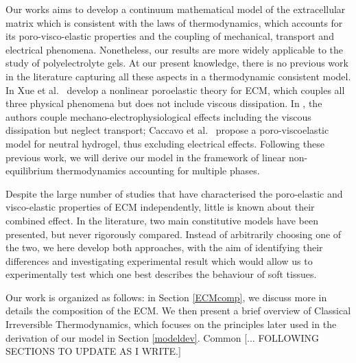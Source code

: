 Our works aims to develop a continuum mathematical model of the extracellular matrix which is consistent with the laws of thermodynamics, which accounts for its poro-visco-elastic properties and the coupling of mechanical, transport and electrical phenomena. Nonetheless, our results are more widely applicable to the study of polyelectrolyte gels. At our present knowledge, there is no previous work in the literature capturing all these aspects in a thermodynamic consistent model. In \cite{ecm1,ecm2} Xue et al.~ develop a nonlinear poroelastic theory for ECM, which couples all three physical phenomena but does not include viscous dissipation. In \cite{Jeru}, the authors couple mechano-electrophysiological effects including the viscous dissipation but neglect transport; Caccavo et al.~ \cite{Article1} propose a poro-viscoelastic model for neutral hydrogel, thus excluding electrical effects.  Following these previous work, we will derive our model in the framework of linear non-equilibrium thermodynamics \cite{NET} accounting for multiple phases.


Despite the large number of studies that have characterised the poro-elastic and visco-elastic properties of ECM independently, little is known about their combined effect. In the literature, two main constitutive models have been presented, but never rigorously compared. Instead of arbitrarily choosing one of the two, we here develop both approaches, with the aim of identifying their differences and investigating experimental result which would allow us to experimentally test which one best describes the behaviour of soft tissues. 

Our work is organized as follows: in Section \ref{ECMcomp}, we discuss more in details the composition of the ECM. We then present a brief overview of Classical Irreversible Thermodynamics, which focuses on the principles later used in the derivation of our model in Section \ref{modeldev}. Common  [... FOLLOWING SECTIONS TO UPDATE AS I WRITE.]